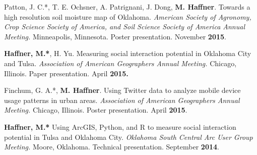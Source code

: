 \begin{cventries}
   \cventry
      {}
      {}
      {}
      {}
      {
        \begin{cvitems}
          \vspace{-2mm}
        \item {Patton, J. C.*, T. E. Ochsner, A. Patrignani, J. Dong, \textbf{M.
              Haffner}. Towards a high resolution soil moisture map of Oklahoma.
            \textit{American Society of Agronomy, Crop Science Society of
              America, and Soil Science Society of America Annual Meeting.}
            Minneapolis, Minnesota. Poster presentation. November
            \textbf{2015}.}
            \end{cvitems}
            }

   \cventry
      {}
      {}
      {}
      {}
      {
        \begin{cvitems}
          \vspace{-2mm}
        \item {\textbf{Haffner, M.*}, H. Yu. Measuring social interaction
            potential in Oklahoma City and Tulsa. \textit{Association of
              American Geographers Annual Meeting.} Chicago, Illinois. Paper
            presentation. April \textbf{2015.}}
              \end{cvitems}
              }

   \cventry
      {}
      {}
      {}
      {}
      {
        \begin{cvitems}
          \vspace{-2mm}
        \item {Finchum, G. A.*, \textbf{M. Haffner}. Using Twitter data to
            analyze mobile device usage patterns in urban areas.
            \textit{Association of American Geographers Annual Meeting.}
            Chicago, Illinois. Poster presentation. April \textbf{2015}.}
              \end{cvitems}
            }

   \cventry
      {}
      {}
      {}
      {}
      {
        \begin{cvitems}
          \vspace{-2mm}
        \item {\textbf{Haffner, M.*} Using ArcGIS, Python, and R to measure
            social interaction potential in Tulsa and Oklahoma City.
            \textit{Oklahoma South Central Arc User Group Meeting.} Moore,
            Oklahoma. Technical presentation. September \textbf{2014}.}
            \end{cvitems}
            }


\end{cventries}
